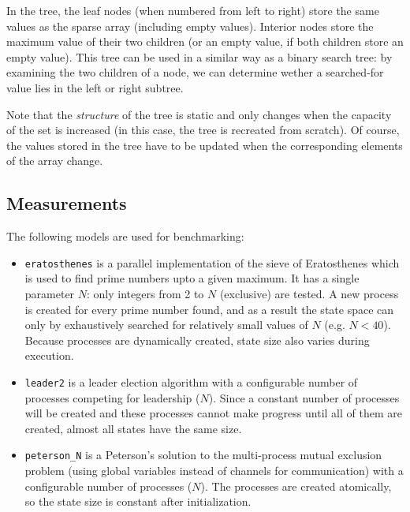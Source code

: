 \documentclass{acm_proc_article-sp}
\begin{document}
In the tree, the leaf nodes (when numbered from left to right) store the same values
as the sparse array (including empty values).
Interior nodes store the maximum value of their two children (or an empty value,
if both children store an empty value).
This tree can be used in a similar way as a binary search tree: by examining the
two children of a node, we can determine wether a searched-for value lies in the
left or right subtree.

Note that the \emph{structure} of the tree is static and only changes when the
capacity of the set is increased (in this case, the tree is recreated from scratch).
Of course, the values stored in the tree have to be updated when the corresponding
elements of the array change.

\subsection{Measurements}



The following models are used for benchmarking:
\begin{itemize}
\item\verb#eratosthenes# is a parallel implementation of the sieve
of Eratosthenes which is used to find prime numbers upto a given maximum.
It has a single parameter $N$: only integers from 2 to $N$ (exclusive) are
tested. A new process is created for every prime number found, and as a result
the state space can only by exhaustively searched for relatively small values
of $N$ (e.g. $N < 40$). Because processes are dynamically created, state size
also varies during execution.

\item\verb#leader2# is a leader election algorithm with a configurable number
of processes competing for leadership ($N$). Since a constant number of
processes will be created and these processes cannot make progress until all
of them are created, almost all states have the same size.

\item\verb#peterson_N# is a Peterson's solution to the multi-process mutual
exclusion problem (using global variables instead of channels for
communication) with a configurable number of processes ($N$). The processes
are created atomically, so the state size is constant after initialization.



\end{itemize}
\end{document}
